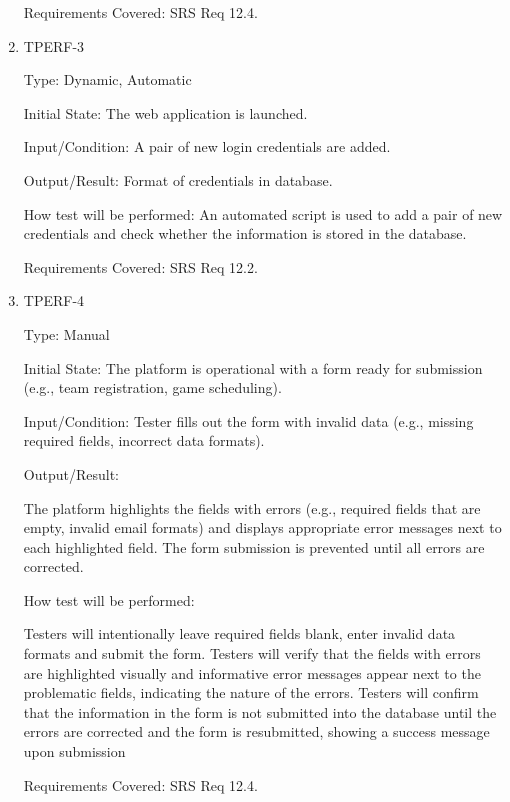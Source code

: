 \documentclass[12pt, titlepage]{article}
\begin{document}
\begin{enumerate}
          Requirements Covered: SRS Req 12.4.

    \item{TPERF-3\\}

          Type: Dynamic, Automatic

          Initial State: The web application is launched.

          Input/Condition: A pair of new login credentials are added.

          Output/Result: Format of credentials in database.

          How test will be performed: An automated script is used to add a pair of
          new credentials and check whether the information is stored in the database.

          Requirements Covered: SRS Req 12.2.

    \item{TPERF-4\\}

          Type: Manual

          Initial State: The platform is operational with a form ready for submission (e.g., team registration, game scheduling).

          Input/Condition: Tester fills out the form with invalid data (e.g., missing required fields, incorrect data formats).

          Output/Result:

          The platform highlights the fields with errors (e.g., required fields that are empty, invalid email formats) and displays appropriate error messages  next to each highlighted field. The form submission is prevented until all errors are corrected.

          How test will be performed:

          Testers will intentionally leave required fields blank, enter invalid data formats  and submit the form. Testers will verify that the fields with errors are highlighted visually and informative error messages appear next to the problematic fields, indicating the nature of the errors. Testers will confirm that the information in the form is not submitted into the database until the errors are corrected and the form is resubmitted, showing a success message upon submission

          Requirements Covered: SRS Req 12.4.

\end{enumerate}
\end{document}
